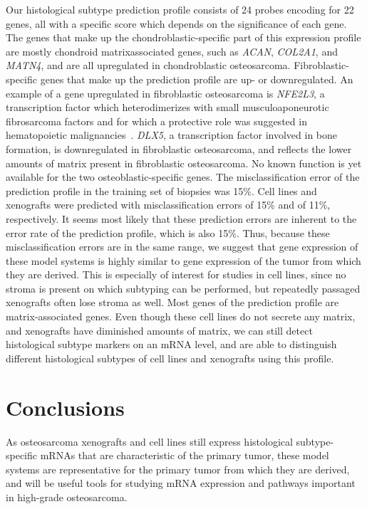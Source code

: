 Our histological subtype prediction profile consists of
24 probes encoding for 22 genes, all with a specific
score which depends on the significance of each gene.
The genes that make up the chondroblastic\hyp{}specific part
of this expression profile are mostly chondroid matrixassociated
genes, such as {\it ACAN}, {\it COL2A1}, and {\it MATN4},
and are all upregulated in chondroblastic osteosarcoma.
Fibroblastic\hyp{}specific genes that make up the prediction
profile are up- or downregulated. An example of a gene
upregulated in fibroblastic osteosarcoma is {\it NFE2L3}, a
transcription factor which heterodimerizes with small
musculoaponeurotic fibrosarcoma factors and for which
a protective role was suggested in hematopoietic malignancies~\cite{chevillard2011nfe2l3}. {\it DLX5}, a transcription factor involved in
bone formation, is downregulated in fibroblastic osteosarcoma,
and reflects the lower amounts of matrix present
in fibroblastic osteosarcoma. No known function is
yet available for the two osteoblastic\hyp{}specific genes. The
misclassification error of the prediction profile in the
training set of biopsies was 15\%. Cell lines and xenografts
were predicted with misclassification errors of
15\% and of 11\%, respectively. It seems most likely that
these prediction errors are inherent to the error rate of
the prediction profile, which is also 15\%. Thus, because
these misclassification errors are in the same range, we
suggest that gene expression of these model systems is
highly similar to gene expression of the tumor from
which they are derived. This is especially of interest for
studies in cell lines, since no stroma is present on which
subtyping can be performed, but repeatedly passaged
xenografts often lose stroma as well. Most genes of the
prediction profile are matrix\hyp{}associated genes. Even
though these cell lines do not secrete any matrix, and
xenografts have diminished amounts of matrix, we can
still detect histological subtype markers on an mRNA
level, and are able to distinguish different histological
subtypes of cell lines and xenografts using this profile.

\section{Conclusions}\label{conclusions3}
As osteosarcoma xenografts and cell lines still express
histological subtype\hyp{}specific mRNAs that are characteristic
of the primary tumor, these model systems are
representative for the primary tumor from which they
are derived, and will be useful tools for studying mRNA
expression and pathways important in high\hyp{}grade
osteosarcoma.


\begin{small}
\begin{singlespace}

\end{singlespace}
\end{small}

%